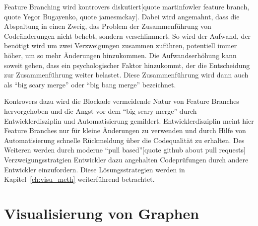 Feature Branching wird kontrovers diskutiert[quote martinfowler feature branch, quote Yegor Bugayenko, quote jamesmckay]. Dabei wird angemahnt, dass die Abspaltung in einen Zweig, das Problem der Zusammenführung von Codeänderungen nicht behebt, sondern verschlimmert. So wird der Aufwand, der benötigt wird um zwei Verzweigungen zusammen zuführen, potentiell immer höher, um so mehr Änderungen hinzukommen. Die Aufwandserhöhung kann soweit gehen, dass ein psychologischer Faktor hinzukommt, der die Entscheidung zur Zusammenführung weiter belastet. Diese Zusammenführung wird dann auch als ``big scary merge'' oder ``big bang merge'' bezeichnet.

Kontrovers dazu wird die Blockade vermeidende Natur von Feature Branches hervorgehoben und die Angst vor dem ``big scary merge'' durch Entwicklerdisziplin und Automatisierung gemildert. Entwicklerdisziplin meint hier Feature Branches nur für kleine Änderungen zu verwenden und durch Hilfe von Automatisierung schnelle Rückmeldung über die Codequalität zu erhalten. Des Weiteren werden durch moderne ``pull based''[quote github about pull requests] Verzweigungsstratgien Entwickler dazu angehalten Codeprüfungen durch andere Entwickler einzufordern. Diese Lösungsstrategien werden in Kapitel~\ref{ch:visu_meth} weiterführend betrachtet.

\section{Visualisierung von Graphen}